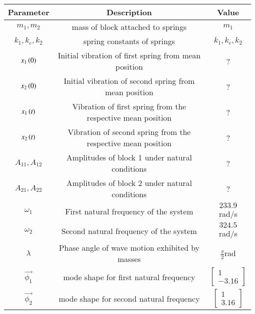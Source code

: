 \begin{tabular}{|c|c|c|}
    \hline
    \textbf{Parameter} & \textbf{Description} & \textbf{Value} \\
    \hline
    $m_1,m_2$ & mass of block attached to springs& $ m_1$\\
    \hline
    $k_1,k_c,k_2$ & spring constants of springs& $ k_1,k_c,k_2$\\
    \hline
    $x_1\left(0\right)$ & Initial vibration of first spring from mean position& ? \\
    \hline
    $x_2\left(0\right)$ & Initial vibration of second spring from mean position & ? \\
    \hline
    $x_1\left(t\right)$ & Vibration of first spring from the respective mean position& ? \\
    \hline
    $x_2\left(t\right)$ & Vibration of second spring from the respective mean position & ? \\
    \hline
    $A_{11},A_{12}$ & Amplitudes of block 1 under natural conditions& ?\\
    \hline
    $A_{21},A_{22}$ & Amplitudes of block 2 under natural conditions& ?\\
    \hline
    $\omega_1$ & First natural frequency of the system& $ 233.9$ rad/s\\
    \hline
    $\omega_2$ & Second natural frequency of the system &$ 324.5$ rad/s \\
    \hline
    $\lambda$ & Phase angle of wave motion exhibited by masses&$ \frac{\pi}{2} $rad\\
    \hline
    $\vec{\phi_1}$ & mode shape for first natural frequency& $ \begin{bmatrix}
1\\
-3.16
\end{bmatrix}$\\
    \hline
    $\vec{\phi_2}$ & mode shape for second natural frequency& $ \begin{bmatrix}
1\\
3.16
\end{bmatrix}$\\
    \hline
\end{tabular}





